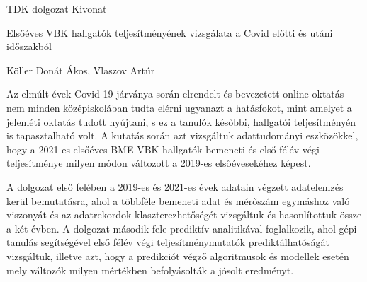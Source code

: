 \documentclass[12pt]{article}
\begin{document}
\begin{center}
\Huge{TDK dolgozat Kivonat}
\vspace{1.3cm}

\Large{Elsőéves VBK hallgatók teljesítményének vizsgálata a Covid előtti és utáni időszakból}
\vspace{0.8cm}

Köller Donát Ákos, Vlaszov Artúr
\end{center}
\vspace{1cm}

Az elmúlt évek Covid-19 járványa során elrendelt és bevezetett online oktatás nem minden középiskolában tudta elérni ugyanazt a hatásfokot, mint amelyet a jelenléti oktatás tudott nyújtani, s ez a tanulók későbbi, hallgatói teljesítményén is tapasztalható volt. A kutatás során azt vizsgáltuk adattudományi eszközökkel, hogy a 2021-es elsőéves BME VBK hallgatók bemeneti és első félév végi teljesítménye milyen módon változott a 2019-es elsőévesekéhez képest.

A dolgozat első felében a 2019-es és 2021-es évek adatain végzett adatelemzés kerül bemutatásra, ahol a többféle bemeneti adat és mérőszám egymáshoz való viszonyát és az adatrekordok klaszterezhetőségét vizsgáltuk és hasonlítottuk össze a két évben. A dolgozat második fele prediktív analitikával foglalkozik, ahol gépi tanulás segítségével első félév végi teljesítménymutatók prediktálhatóságát vizsgáltuk, illetve azt, hogy a predikciót végző algoritmusok és modellek esetén mely változók milyen mértékben befolyásolták a jósolt eredményt.
\end{document}
